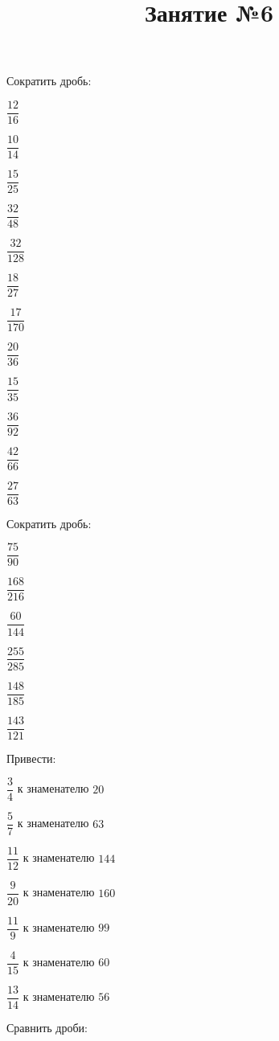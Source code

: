 \newpage
\title{Занятие №6}
\begin{listofex}
	\item Сократить дробь:
	\begin{enumcols}[itemcolumns=6]
		\item \( \dfrac{12}{16} \)
		\item \( \dfrac{10}{14} \)
		\item \( \dfrac{15}{25} \)
		\item \( \dfrac{32}{48} \)
		\item \( \dfrac{32}{128} \)
		\item \( \dfrac{18}{27} \)
		\item \( \dfrac{17}{170} \)
		\item \( \dfrac{20}{36} \)
		\item \( \dfrac{15}{35} \)
		\item \( \dfrac{36}{92} \)
		\item \( \dfrac{42}{66} \)
		\item \( \dfrac{27}{63} \)
	\end{enumcols}
	\item Сократить дробь:
	\begin{enumcols}[itemcolumns=6]
		\item \( \dfrac{75}{90} \)
		\item \( \dfrac{168}{216} \)
		\item \( \dfrac{60}{144} \)
		\item \( \dfrac{255}{285} \)
		\item \( \dfrac{148}{185} \)
		\item \( \dfrac{143}{121} \)
	\end{enumcols}
	\item Привести:
	\begin{enumcols}[itemcolumns=2]
		\item \( \dfrac{3}{4} \) к знаменателю \( 20 \)
		\item \( \dfrac{5}{7} \) к знаменателю \( 63 \)
		\item \( \dfrac{11}{12} \) к знаменателю \( 144 \)
		\item \( \dfrac{9}{20} \) к знаменателю \( 160 \)
		\item \( \dfrac{11}{9} \) к знаменателю \( 99		 \)
		\item \( \dfrac{4}{15} \) к знаменателю \( 60 \)
		\item \( \dfrac{13}{14} \) к знаменателю \( 56 \)
	\end{enumcols}
	\item Сравнить дроби:

\end{listofex}
